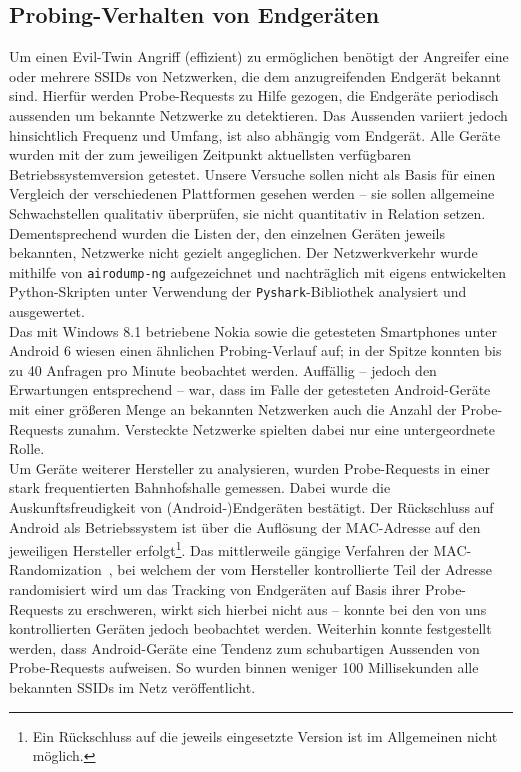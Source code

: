 \subsection{Probing-Verhalten von Endgeräten}\label{subs:praxisprobes}
Um einen Evil-Twin Angriff (effizient) zu ermöglichen benötigt der Angreifer eine oder mehrere SSIDs von Netzwerken, die dem anzugreifenden Endgerät bekannt sind.
Hierfür werden Probe-Requests zu Hilfe gezogen, die Endgeräte periodisch aussenden um bekannte Netzwerke zu detektieren.
Das Aussenden variiert jedoch hinsichtlich Frequenz und Umfang, ist also abhängig vom Endgerät.
Alle Geräte wurden mit der zum jeweiligen Zeitpunkt aktuellsten verfügbaren Betriebssystemversion getestet. Unsere Versuche sollen nicht als Basis für einen Vergleich der verschiedenen Plattformen gesehen werden -- sie sollen allgemeine Schwachstellen qualitativ überprüfen, sie nicht quantitativ in Relation setzen. Dementsprechend wurden die Listen der, den einzelnen Geräten jeweils bekannten, Netzwerke nicht gezielt angeglichen. Der Netzwerkverkehr wurde mithilfe von \texttt{airodump-ng} aufgezeichnet und nachträglich mit eigens entwickelten Python-Skripten unter Verwendung der \texttt{Pyshark}-Bibliothek analysiert und ausgewertet.\\

Das mit Windows 8.1 betriebene Nokia sowie die getesteten Smartphones unter Android 6 wiesen einen ähnlichen Probing-Verlauf auf; in der Spitze konnten bis zu 40 Anfragen pro Minute beobachtet werden.
Auffällig -- jedoch den Erwartungen entsprechend -- war, dass im Falle der getesteten Android-Geräte mit einer größeren Menge an bekannten Netzwerken auch die Anzahl der Probe-Requests zunahm. Versteckte Netzwerke spielten dabei nur eine untergeordnete Rolle.\\

Um Geräte weiterer Hersteller zu analysieren, wurden Probe-Requests in einer stark frequentierten Bahnhofshalle gemessen. Dabei wurde die Auskunftsfreudigkeit von (Android-)Endgeräten bestätigt. Der Rückschluss auf Android als Betriebssystem ist über die Auflösung der MAC-Adresse auf den jeweiligen Hersteller erfolgt\footnote{Ein Rückschluss auf die jeweils eingesetzte Version ist im Allgemeinen nicht möglich.}.
Das mittlerweile gängige Verfahren der MAC-Randomization~\cite{android6changes, windows10wireless}, bei welchem der vom Hersteller kontrollierte Teil der Adresse randomisiert wird um das Tracking von Endgeräten auf Basis ihrer Probe-Requests zu erschweren, wirkt sich hierbei nicht aus -- konnte bei den von uns kontrollierten Geräten jedoch beobachtet werden.
Weiterhin konnte festgestellt werden, dass Android-Geräte eine Tendenz zum schubartigen Aussenden von Probe-Requests aufweisen.
So wurden binnen weniger 100 Millisekunden alle bekannten SSIDs im Netz veröffentlicht.\\

